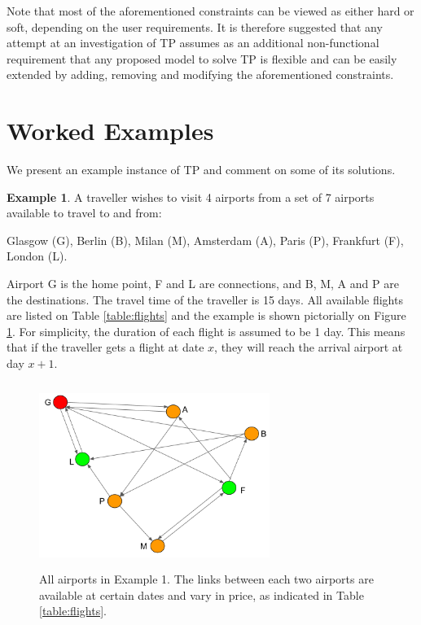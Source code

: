 \documentclass{mprop}
\theoremstyle{definition}
\newtheorem{example}{Example}
\begin{document}
Note that most of the aforementioned constraints can be viewed as either hard or soft, depending on the user requirements. It is therefore suggested that any attempt at an investigation of TP assumes as an additional non-functional requirement that any proposed model to solve TP is flexible and can be easily extended by adding, removing and modifying the aforementioned constraints.

\section{Worked Examples}
\label{sec:tpexample}
We present an example instance of TP and comment on some of its solutions.

\begin{example}
\label{example1}
A traveller wishes to visit 4 airports from a set of 7 airports available to travel to and from: 

Glasgow (G), Berlin (B), Milan (M), Amsterdam (A), Paris (P), Frankfurt (F), London (L).

Airport G is the home point, F and L are connections, and B, M, A and P are the destinations. The travel time of the traveller is 15 days. All available flights are listed on Table \ref{table:flights} and the example is shown pictorially on Figure \ref{fig:map}. For simplicity, the duration of each flight is assumed to be 1 day. This means that if the traveller gets a flight at date $x$, they will reach the arrival airport at day $x+1$.

\begin{figure}
\centering
\includegraphics[height=6cm, width=7.5cm]{images/map.png}
\caption{All airports in Example 1. The links between each two airports are available at certain dates and vary in price, as indicated in Table \ref{table:flights}.}
\label{fig:map}
\end{figure}


\end{example}
\end{document}
